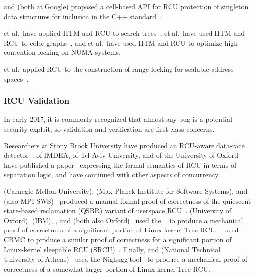  and  (both at Google) proposed
a cell-based API for RCU
protection of singleton data structures for inclusion in the
C++ standard~\cite{GeoffRomer2018C++DeferredReclamationP0561R4}.

 et al.~have applied
HTM and RCU to search trees~\cite{Siakavaras2017CombiningHA,DimitriosSiakavaras2020RCU-HTM-B+Trees},
 et al.~have used HTM and RCU to color
graphs~\cite{ChristinaGiannoula2018HTM-RCU-graphcoloring},
and
 et al.~have used HTM and RCU to optimize high-contention
locking on NUMA systems.

 et al.~applied RCU to the construction of range locking
for scalable address spaces~\cite{AlexKogan2020RCUrangelocks}.

\fi

\subsubsection{RCU Validation}
\label{sec:defer:RCU Validation}

In early 2017, it is commonly recognized that almost any bug is a potential
security exploit, so validation and verification are first-class concerns.

Researchers at Stony Brook University have produced an RCU-aware data-race
detector~\cite{AbhinavDuggal2010Masters,JustinSeyster2012PhD,Seyster:2011:RFA:2075416.2075425}.
 of IMDEA,  of Tel Aviv University,
and  of the University of Oxford have published a
paper~\cite{AlexeyGotsman2012VerifyGraceExtended} expressing the formal
semantics of RCU in terms of separation logic, and have continued with
other aspects of concurrency.

 (Carnegie-Mellon University),  (Max
Planck Institute for Software Systems), and 
(also MPI-SWS)~\cite{JosephTassarotti2015RCUproof}
produced a manual formal proof of correctness of the quiescent-state-based
reclamation (QSBR) variant of userspace
RCU~\cite{MathieuDesnoyers2009URCU,MathieuDesnoyers2012URCU}.
 (University of Oxford),  (IBM),
, and 
(both also Oxford)~\cite{LihaoLiang2016VerifyTreeRCU}
used the ~\cite{EdmundClarke2004CBMC}
to produce a mechanical proof of correctness of a significant portion
of Linux-kernel Tree RCU\@.
~\cite{LanceRoy2017CBMC-SRCU} used CBMC to produce a similar
proof of correctness for a significant portion of Linux-kernel
sleepable RCU (SRCU)~\cite{PaulEMcKenney2006c}.
Finally,  and 
(National Technical University of
Athens)~\cite{MichalisKokologiannakis2017NidhuggRCU,MichalisKokologiannakis2019RCUstatelessModelCheck}
used the Nighugg tool~\cite{CarlLeonardsson2014Nidhugg}
to produce a mechanical proof of correctness of a somewhat larger
portion of Linux-kernel Tree RCU\@.

